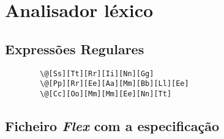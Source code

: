 \section{Analisador léxico}
\label{sec:lexico:desenho}

\subsection{Expressões Regulares}
\label{sec:subsec:ers:desenho}

\begin{verbatim}
		\@[Ss][Tt][Rr][Ii][Nn][Gg]
		\@[Pp][Rr][Ee][Aa][Mm][Bb][Ll][Ee]
		\@[Cc][Oo][Mm][Mm][Ee][Nn][Tt]
\end{verbatim}

\subsection{Ficheiro \emph{Flex} com a especificação}
\label{sec:subsection:flex:desenho}


